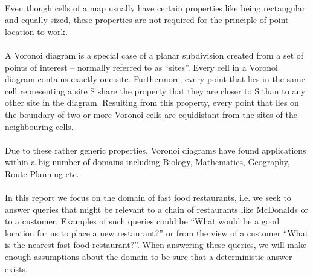 \paragraph{}
Even though cells of a map usually have certain properties like being rectangular and equally sized, these properties are not required for the principle of point location to work. 

\paragraph{}
A Voronoi diagram is a special case of a planar subdivision created from a set of points of interest – normally referred to as “sites”. Every cell in a Voronoi diagram contains exactly one site. Furthermore, every point that lies in the same cell representing a site S share the property that they are closer to S than to any other site in the diagram. Resulting from this property, every point that lies on the boundary of two or more Voronoi cells are equidistant from the sites of the neighbouring cells.

\paragraph{}
Due to these rather generic properties, Voronoi diagrams have found applications within a big number of domains including Biology, Mathematics, Geography, Route Planning etc. 

\paragraph{}
In this report we focus on the domain of fast food restaurants, i.e. we seek to answer queries that might be relevant to a chain of restaurants like McDonalds or to a customer. Examples of such queries could be “What would be a good location for us to place a new restaurant?” or from the view of a customer “What is the nearest fast food restaurant?”. When answering these queries, we will make enough assumptions about the domain to be sure that a deterministic answer exists.

